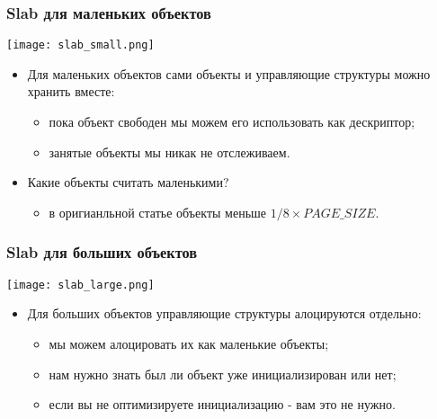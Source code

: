 \begin{frame}
\frametitle{Slab для маленьких объектов}
\begin{center}
  \texttt{[image: slab\_small.png]}
\end{center}
\begin{itemize}
  \item Для маленьких объектов сами объекты и управляющие структуры можно
  хранить вместе:
  \begin{itemize}
    \item пока объект свободен мы можем его использовать как дескриптор;
    \item занятые объекты мы никак не отслеживаем.
  \end{itemize}
  \item Какие объекты считать маленькими?
  \begin{itemize}
    \item в оригианльной статье объекты меньше $1/8 \times PAGE\_SIZE$. 
  \end{itemize}
\end{itemize}
\end{frame}

\begin{frame}
\frametitle{Slab для больших объектов}
\begin{center}
  \texttt{[image: slab\_large.png]}
\end{center}
\begin{itemize}
  \item Для больших объектов управляющие структуры алоцируются отдельно:
  \begin{itemize}
    \item мы можем алоцировать их как маленькие объекты;
    \item нам нужно знать был ли объект уже инициализирован или нет;
    \item если вы не оптимизируете инициализацию - вам это не нужно.
  \end{itemize}
\end{itemize}
\end{frame}
